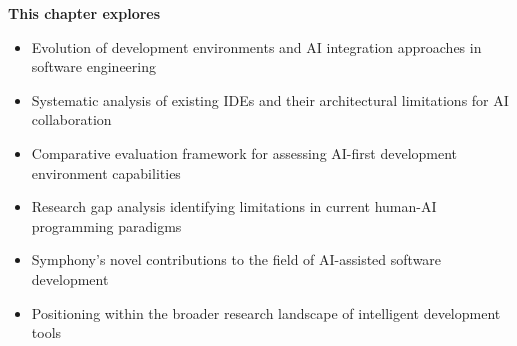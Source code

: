 
\begin{tcolorbox}[
    enhanced,
    colback=white,
    colframe=brandAccent!40,
    boxrule=1.5pt,
    arc=15pt,
    drop shadow={brandAccent!25},
    left=1.5cm,
    right=1.5cm,
    top=1.2cm,
    bottom=1.2cm
]
\begin{center}
{\Large\textbf{\textcolor{brandAccent}{This chapter explores}}}
\end{center}

\vspace{0.8cm}

\begin{itemize}[leftmargin=1.2cm, itemsep=0.4cm, label={\textcolor{brandAccent}{$\blacktriangleright$}}]
    \item {\large Evolution of development environments and AI integration approaches in software engineering}
    \item {\large Systematic analysis of existing IDEs and their architectural limitations for AI collaboration}
    \item {\large Comparative evaluation framework for assessing AI-first development environment capabilities}
    \item {\large Research gap analysis identifying limitations in current human-AI programming paradigms}
    \item {\large Symphony's novel contributions to the field of AI-assisted software development}
    \item {\large Positioning within the broader research landscape of intelligent development tools}
\end{itemize}
\end{tcolorbox}

\clearpage
